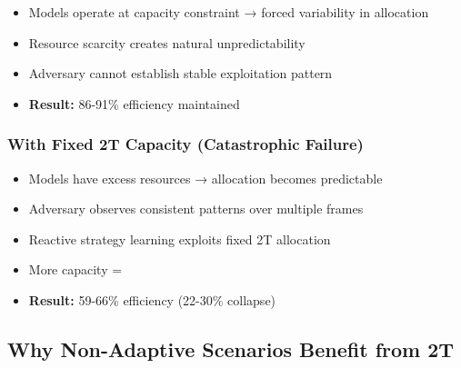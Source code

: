\vspace{-0.2cm}
\begin{itemize}
    \vspace{-0.2cm}
    \item Models operate at capacity constraint → forced variability in allocation
    \vspace{-0.2cm}
    \item Resource scarcity creates natural unpredictability
    \vspace{-0.2cm}
    \item Adversary cannot establish stable exploitation pattern
    \vspace{-0.2cm}
    \item \textbf{Result:} 86-91\% efficiency maintained
\end{itemize}

\subsubsection{With Fixed 2T Capacity (Catastrophic Failure)}

\vspace{-0.2cm}
\begin{itemize}
    \vspace{-0.2cm}
    \item Models have excess resources → allocation becomes predictable
    \vspace{-0.2cm}
    \item Adversary observes consistent patterns over multiple frames
    \vspace{-0.2cm}
    \item Reactive strategy learning exploits fixed 2T allocation
    \vspace{-0.2cm}
    \item More capacity = 
    \vspace{-0.2cm}
    \item \textbf{Result:} 59-66\% efficiency (22-30\% collapse)
\end{itemize}

\subsection{Why Non-Adaptive Scenarios Benefit from 2T}

